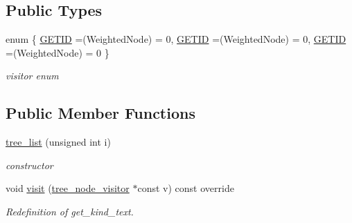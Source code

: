 \subsection*{Public Types}
\begin{DoxyCompactItemize}
\item 
enum \{ \hyperlink{structtree__list_ac6545131d517531b72348f5148adb5b0a8d7819b6bfdc53981941b3696071dcd6}{G\+E\+T\+ID} =(Weighted\+Node) = 0, 
\hyperlink{structtree__list_ac6545131d517531b72348f5148adb5b0a8d7819b6bfdc53981941b3696071dcd6}{G\+E\+T\+ID} =(Weighted\+Node) = 0, 
\hyperlink{structtree__list_ac6545131d517531b72348f5148adb5b0a8d7819b6bfdc53981941b3696071dcd6}{G\+E\+T\+ID} =(Weighted\+Node) = 0
 \}\begin{DoxyCompactList}\small\item\em visitor enum \end{DoxyCompactList}
\end{DoxyCompactItemize}
\subsection*{Public Member Functions}
\begin{DoxyCompactItemize}
\item 
\hyperlink{structtree__list_abe27ede4909074d13d542f7d744f12d8}{tree\+\_\+list} (unsigned int i)
\begin{DoxyCompactList}\small\item\em constructor \end{DoxyCompactList}\item 
void \hyperlink{structtree__list_aba63a94a601053b16420e7f757237b5d}{visit} (\hyperlink{classtree__node__visitor}{tree\+\_\+node\+\_\+visitor} $\ast$const v) const override
\begin{DoxyCompactList}\small\item\em Redefinition of get\+\_\+kind\+\_\+text. \end{DoxyCompactList}\end{DoxyCompactItemize}
